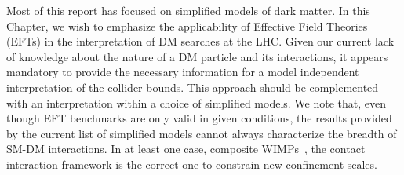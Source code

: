 


Most of this report has focused on simplified models of dark matter.
In this Chapter, we wish to emphasize the applicability of
Effective Field Theories (EFTs) 
in the interpretation of DM searches at the LHC.
Given our current lack of knowledge about the nature of a DM particle and
its interactions, it appears mandatory to provide the necessary information
for a model independent interpretation of the collider bounds.
This approach should be complemented with
an interpretation within a choice of simplified models.
We note that, even though EFT benchmarks are only valid in given conditions,
the results provided by the current list of simplified models cannot always
characterize the breadth of SM-DM interactions.
In at least one case, composite WIMPs~\cite{Nussinov:1985xr,Kaplan:1991ah,Banks:2010eh}, 
the contact interaction framework is the correct one to
constrain new confinement scales. 

